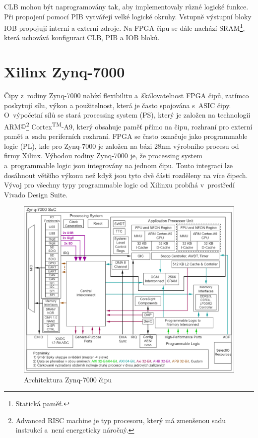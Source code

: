 CLB mohou být naprogramovány tak, aby implementovaly různé logické funkce. Při propojení pomocí PIB vytvářejí velké logické okruhy. Vstupně výstupní bloky IOB propojují interní a externí zdroje. Na FPGA čipu se dále nachází SRAM\footnote{Statická paměť.\label{foot:sram}}, která uchovává konfiguraci CLB, PIB a IOB bloků.\cite{Sekanina3540403779ISBN}
\section{Xilinx Zynq-7000}
Čipy z~rodiny Zynq-7000 nabízí flexibilitu a~škálovatelnost FPGA čipů, zatímco poskytují sílu, výkon a použitelnost, která je často spojována s~ASIC čipy.
O~výpočetní sílů se stará processing system (PS), který je založen na technologii ARM$\copyright$\footnote{Advanced RISC machine je typ procesoru, který má zmenšenou sadu instrukcí a~není energeticky náročný.\label{foot:ARM}} Cortex\textsuperscript{TM}-A9, který obsahuje paměť přímo na čipu, rozhraní pro externí paměť a~sadu periferních rozhraní. FPGA se často označuje jako programmable logic (PL), kde pro Zynq-7000 je založen na bázi 28nm výrobního procesu od firmy Xilinx. Výhodou rodiny Zynq-7000 je, že processing system a~programmable logic jsou integrovány na jednom čipu. Touto integrací lze dosáhnout většího výkonu než když jsou tyto dvě části rozděleny na více čipech. Vývoj pro všechny typy programmable logic od Xilinxu probíhá v~prostředí Vivado Design Suite.\cite{Zynq-7000}
\begin{figure}[!h]
  \begin{center}
    \includegraphics[scale=0.4]{obrazky/Zynq-7000-own.png}
  \end{center}
  \caption[Architektura Zynq-7000]{Architektura Zynq-7000 čipu \cite{Zynq-7000}}
  \label{img:Zynq-7000}
\end{figure}
